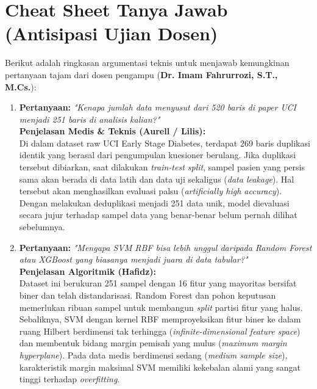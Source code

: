 \documentclass[11pt,a4paper]{article}
\begin{document}
\newpage

\section{Cheat Sheet Tanya Jawab (Antisipasi Ujian Dosen)}

Berikut adalah ringkasan argumentasi teknis untuk menjawab kemungkinan pertanyaan tajam dari dosen pengampu (\textbf{Dr. Imam Fahrurrozi, S.T., M.Cs.}):

\begin{enumerate}[leftmargin=*,itemsep=8pt]
    \item \textbf{Pertanyaan:} \textit{"Kenapa jumlah data menyusut dari 520 baris di paper UCI menjadi 251 baris di analisis kalian?"}\\
    \textbf{Penjelasan Medis \& Teknis (Aurell / Lilis):}\\
    Di dalam dataset raw UCI Early Stage Diabetes, terdapat 269 baris duplikasi identik yang berasal dari pengumpulan kuesioner berulang. Jika duplikasi tersebut dibiarkan, saat dilakukan \textit{train-test split}, sampel pasien yang persis sama akan berada di data latih dan data uji sekaligus (\textit{data leakage}). Hal tersebut akan menghasilkan evaluasi palsu (\textit{artificially high accuracy}). Dengan melakukan deduplikasi menjadi 251 data unik, model dievaluasi secara jujur terhadap sampel data yang benar-benar belum pernah dilihat sebelumnya.

    \item \textbf{Pertanyaan:} \textit{"Mengapa SVM RBF bisa lebih unggul daripada Random Forest atau XGBoost yang biasanya menjadi juara di data tabular?"}\\
    \textbf{Penjelasan Algoritmik (Hafidz):}\\
    Dataset ini berukuran 251 sampel dengan 16 fitur yang mayoritas bersifat biner dan telah distandarisasi. Random Forest dan pohon keputusan memerlukan ribuan sampel untuk membangun \textit{split} partisi fitur yang halus. Sebaliknya, SVM dengan kernel RBF memproyeksikan fitur biner ke dalam ruang Hilbert berdimensi tak terhingga (\textit{infinite-dimensional feature space}) dan membentuk bidang margin pemisah yang mulus (\textit{maximum margin hyperplane}). Pada data medis berdimensi sedang (\textit{medium sample size}), karakteristik margin maksimal SVM memiliki kekebalan alami yang sangat tinggi terhadap \textit{overfitting}.


\end{enumerate}
\end{document}
